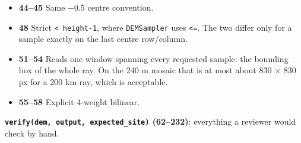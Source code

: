 \documentclass[11pt,a4paper]{article}
\providecommand{\tightlist}{\setlength{\itemsep}{0pt}\setlength{\parskip}{0pt}}
\begin{document}
\begin{itemize}
\tightlist
\item
  \textbf{44--45} Same −0.5 centre convention.
\item
  \textbf{48} Strict \texttt{< height-1}, where
  \texttt{DEMSampler} uses
  \texttt{<=}. The two differ only for a sample exactly
  on the last centre row/column.
\item
  \textbf{51--54} Reads one window spanning every requested sample: the
  bounding box of the whole ray. On the 240 m mosaic that is at most
  about 830 × 830 px for a 200 km ray, which is acceptable.
\item
  \textbf{55--58} Explicit 4-weight bilinear.
\end{itemize}

\textbf{\texttt{verify(dem, output, expected\_site)}
(62--232)}: everything a reviewer would check by hand.
\end{document}
